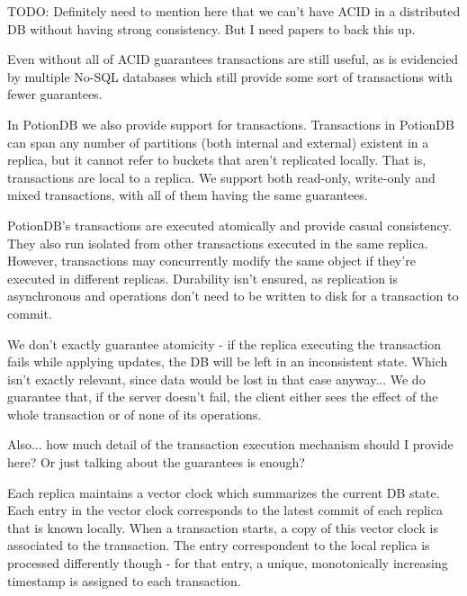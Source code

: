 \documentclass{vldb}
\newcommand{\grumbler}[2]{{\color{red}{\bf #1:} #2}}
\newcommand{\andre}[1]{\grumbler{andre}{#1}}
\begin{document}
\andre{TODO: Definitely need to mention here that we can't have ACID in a distributed DB without having strong consistency. But I need papers to back this up.} %

Even without all of ACID guarantees transactions are still useful, as is evidencied by multiple No-SQL databases which still provide some sort of transactions \cite{???} with fewer guarantees. %

In PotionDB we also provide support for transactions. 
Transactions in PotionDB can span any number of partitions (both internal and external) existent in a replica, but it cannot refer to buckets that aren't replicated locally.
That is, transactions are local to a replica.
We support both read-only, write-only and mixed transactions, with all of them having the same guarantees.

PotionDB's transactions are executed atomically and provide casual consistency. 
They also run isolated from other transactions executed in the same replica. 
However, transactions may concurrently modify the same object if they're executed in different replicas.
Durability isn't ensured, as replication is asynchronous and operations don't need to be written to disk for a transaction to commit. %

\andre{We don't exactly guarantee atomicity - if the replica executing the transaction fails while applying updates, the DB will be left in an inconsistent state. Which isn't exactly relevant, since data would be lost in that case anyway... We do guarantee that, if the server doesn't fail, the client either sees the effect of the whole transaction or of none of its operations.}

\andre{Also... how much detail of the transaction execution mechanism should I provide here? Or just talking about the guarantees is enough?}

Each replica maintains a vector clock which summarizes the current DB state.
Each entry in the vector clock corresponds to the latest commit of each replica that is known locally.
When a transaction starts, a copy of this vector clock is associated to the transaction.
The entry correspondent to the local replica is processed differently though - for that entry, a unique, monotonically increasing timestamp is assigned to each transaction.
\end{document}
